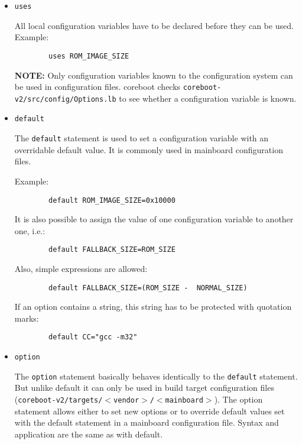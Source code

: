 \documentclass[titlepage,12pt]{article}
\begin{document}
\begin{itemize}

\item \begin{verbatim}uses\end{verbatim}

All local configuration variables have to be declared before they can be
used. Example:
\begin{verbatim}
        uses ROM_IMAGE_SIZE
\end{verbatim}

\textbf{NOTE:} Only configuration variables known to the configuration
system can be used in configuration files. coreboot checks 
\texttt{coreboot-v2/src/config/Options.lb} to see whether a configuration
variable is known.

\item \begin{verbatim}default\end{verbatim}

The \texttt{default} statement is used to set a configuration variable
with an overridable default value. It is commonly used in mainboard
configuration files.  

Example:

\begin{verbatim}
        default ROM_IMAGE_SIZE=0x10000
\end{verbatim}

It is also possible to assign the value of one configuration variable to
another one, i.e.:

\begin{verbatim}
        default FALLBACK_SIZE=ROM_SIZE
\end{verbatim}

Also, simple expressions are allowed:

\begin{verbatim}
        default FALLBACK_SIZE=(ROM_SIZE -  NORMAL_SIZE)
\end{verbatim}

If an option contains a string, this string has to be protected with
quotation marks: 

\begin{verbatim}
        default CC="gcc -m32"
\end{verbatim}

\item \begin{verbatim}option\end{verbatim}

The \texttt{option} statement basically behaves identically to the
\texttt{default} statement. But unlike default it can only be used in
build target configuration files
(\texttt{coreboot-v2/targets/$<$vendor$>$/$<$mainboard$>$}). The option
statement allows either to set new options or to override default values
set with the default statement in a mainboard configuration file.
Syntax and application are the same as with default.

\end{itemize}
\end{document}

